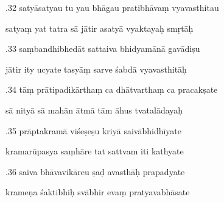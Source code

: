 \documentclass[article,12pt,a4paper]{memoir}%
\newcounter{parCount}
\begin{document}
	  
	  \pstart {}.32 satyāsatyau tu yau bhāgau pratibhāvaṃ vyavasthitau 
	{}
	\pend%
      

	  
	  \pstart \leavevmode%
	satyaṃ yat tatra sā jātir asatyā vyaktayaḥ smṛtāḥ 
	{}
	\pend%
      

	  
	  \pstart {}.33 saṃbandhibhedāt sattaiva bhidyamānā gavādiṣu 
	{}
	\pend%
      

	  
	  \pstart \leavevmode%
	jātir ity ucyate tasyāṃ sarve śabdā vyavasthitāḥ 
	{}
	\pend%
      

	  
	  \pstart {}.34 tāṃ prātipadikārthaṃ ca dhātvarthaṃ ca pracakṣate 
	{}
	\pend%
      

	  
	  \pstart \leavevmode%
	sā nityā sā mahān ātmā tām āhus tvatalādayaḥ 
	{}
	\pend%
      

	  
	  \pstart {}.35 prāptakramā viśeṣeṣu kriyā saivābhidhīyate 
	{}
	\pend%
      

	  
	  \pstart \leavevmode%
	kramarūpasya saṃhāre tat sattvam iti kathyate 
	{}
	\pend%
      

	  
	  \pstart {}.36 saiva bhāvavikāreu ṣaḍ avasthāḥ prapadyate 
	{}
	\pend%
      

	  
	  \pstart \leavevmode%
	krameṇa śaktibhiḥ svābhir evaṃ pratyavabhāsate 
	{}
	\pend%
      
\end{document}
